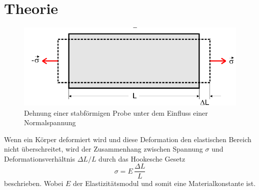 \section{Theorie}
\label{sec:Theorie}




\begin{figure}
    \centering
    \includegraphics[width=\textwidth/2]{images/skizze_1.png}
    \caption{Dehnung einer stabförmigen Probe unter dem Einfluss einer Normalspannung\cite{V103}}
    \label{fig:skizze_1}
\end{figure}
Wenn ein Körper deformiert wird und diese Deformation den elastischen Bereich nicht überschreitet, wird der Zusammenhang zwischen Spannung $\sigma$ und Deformationsverhältnis $\Delta L / L$ durch das Hookesche Gesetz
\begin{equation}
    \sigma = E \, \frac{\Delta L}{L}
    \label{eq:hookesches_gesetz}
\end{equation}
beschrieben. \cite{V103}
Wobei $E$ der Elastizitätsmodul und somit eine Materialkonstante ist.

